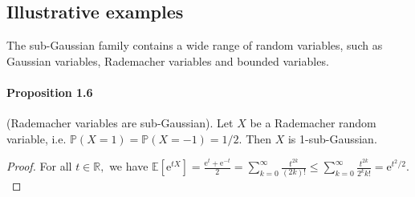 \documentclass{article}
\newcommand{\E}{\mathbb{E}}
\begin{document}
\subsection{Illustrative examples}
The sub-Gaussian family contains a wide range of random variables, such as Gaussian variables, Rademacher variables and bounded variables.
\paragraph{Proposition 1.6} (Rademacher variables are sub-Gaussian). Let $X$ be a Rademacher random variable, i.e. $\mathbb{P}(X=1)=\mathbb{P}(X=-1)=1/2.$ Then $X$ is 1-sub-Gaussian.
\begin{proof} For all $t\in\mathbb{R},$ we have
$\displaystyle\E[\mathrm{e}^{tX}] = \frac{\mathrm{e}^t + \mathrm{e}^{-t}}{2} = \sum_{k=0}^\infty \frac{t^{2k}}{(2k)!} \leq \sum_{k=0}^\infty \frac{t^{2k}}{2^k k!} = \mathrm{e}^{t^2/2}.$
\end{proof}
\end{document}
